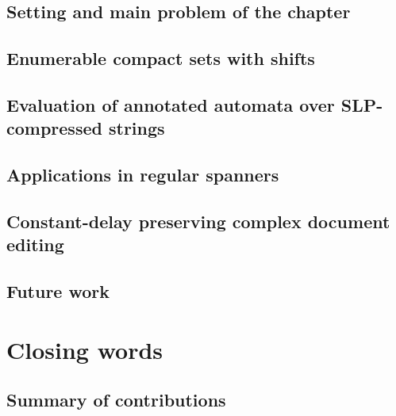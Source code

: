 \documentclass[pdftex]{pucthesis}	%
\begin{document}


\section{Setting and main problem of the chapter}\label{slps:sec:setting}



\section{Enumerable compact sets with shifts}\label{slps:sec:ecs}



\section{Evaluation of annotated automata over SLP-compressed strings}\label{slps:sec:evaluation}



\section{Applications in regular spanners}\label{slps:sec:spanners}



\section{Constant-delay preserving complex document editing}\label{slps:sec:edits}



\section{Future work}\label{slps:sec:conclusions}




\chapter[CLOSING WORDS]{Closing words}

\section{Summary of contributions}
\end{document}
